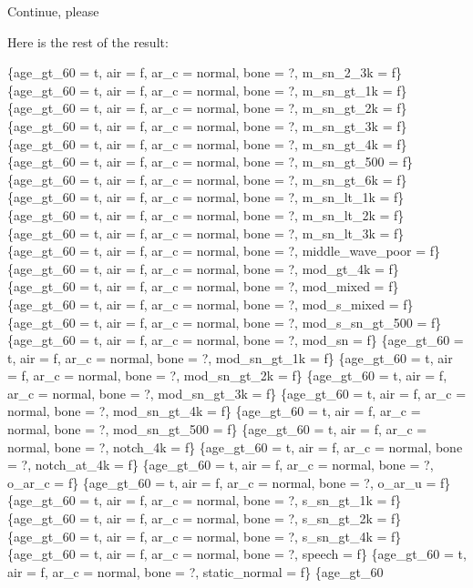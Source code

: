\documentclass[12pt]{article}
\begin{document}
Continue, please
\begin{mdframed}

Here is the rest of the result:
\newline

    \{age\_gt\_60 = t, air = f, ar\_c = normal, bone = ?, m\_sn\_2\_3k = f\}
    \{age\_gt\_60 = t, air = f, ar\_c = normal, bone = ?, m\_sn\_gt\_1k = f\}
    \{age\_gt\_60 = t, air = f, ar\_c = normal, bone = ?, m\_sn\_gt\_2k = f\}
    \{age\_gt\_60 = t, air = f, ar\_c = normal, bone = ?, m\_sn\_gt\_3k = f\}
    \{age\_gt\_60 = t, air = f, ar\_c = normal, bone = ?, m\_sn\_gt\_4k = f\}
    \{age\_gt\_60 = t, air = f, ar\_c = normal, bone = ?, m\_sn\_gt\_500 = f\}
    \{age\_gt\_60 = t, air = f, ar\_c = normal, bone = ?, m\_sn\_gt\_6k = f\}
    \{age\_gt\_60 = t, air = f, ar\_c = normal, bone = ?, m\_sn\_lt\_1k = f\}
    \{age\_gt\_60 = t, air = f, ar\_c = normal, bone = ?, m\_sn\_lt\_2k = f\}
    \{age\_gt\_60 = t, air = f, ar\_c = normal, bone = ?, m\_sn\_lt\_3k = f\}
    \{age\_gt\_60 = t, air = f, ar\_c = normal, bone = ?, middle\_wave\_poor = f\}
    \{age\_gt\_60 = t, air = f, ar\_c = normal, bone = ?, mod\_gt\_4k = f\}
    \{age\_gt\_60 = t, air = f, ar\_c = normal, bone = ?, mod\_mixed = f\}
    \{age\_gt\_60 = t, air = f, ar\_c = normal, bone = ?, mod\_s\_mixed = f\}
    \{age\_gt\_60 = t, air = f, ar\_c = normal, bone = ?, mod\_s\_sn\_gt\_500 = f\}
    \{age\_gt\_60 = t, air = f, ar\_c = normal, bone = ?, mod\_sn = f\}
    \{age\_gt\_60 = t, air = f, ar\_c = normal, bone = ?, mod\_sn\_gt\_1k = f\}
    \{age\_gt\_60 = t, air = f, ar\_c = normal, bone = ?, mod\_sn\_gt\_2k = f\}
    \{age\_gt\_60 = t, air = f, ar\_c = normal, bone = ?, mod\_sn\_gt\_3k = f\}
    \{age\_gt\_60 = t, air = f, ar\_c = normal, bone = ?, mod\_sn\_gt\_4k = f\}
    \{age\_gt\_60 = t, air = f, ar\_c = normal, bone = ?, mod\_sn\_gt\_500 = f\}
    \{age\_gt\_60 = t, air = f, ar\_c = normal, bone = ?, notch\_4k = f\}
    \{age\_gt\_60 = t, air = f, ar\_c = normal, bone = ?, notch\_at\_4k = f\}
    \{age\_gt\_60 = t, air = f, ar\_c = normal, bone = ?, o\_ar\_c = f\}
    \{age\_gt\_60 = t, air = f, ar\_c = normal, bone = ?, o\_ar\_u = f\}
    \{age\_gt\_60 = t, air = f, ar\_c = normal, bone = ?, s\_sn\_gt\_1k = f\}
    \{age\_gt\_60 = t, air = f, ar\_c = normal, bone = ?, s\_sn\_gt\_2k = f\}
    \{age\_gt\_60 = t, air = f, ar\_c = normal, bone = ?, s\_sn\_gt\_4k = f\}
    \{age\_gt\_60 = t, air = f, ar\_c = normal, bone = ?, speech = f\}
    \{age\_gt\_60 = t, air = f, ar\_c = normal, bone = ?, static\_normal = f\}
    \{age\_gt\_60
\end{mdframed}
\end{document}
